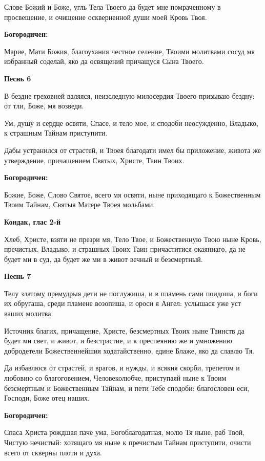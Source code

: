 Слове Божий и Боже, угль Тела Твоего да будет мне помраченному в просвещение, и очищение оскверненной души моей Кровь Твоя.


\medskip
\bfseries Богородичен:\normalfont{}

Марие, Мати Божия, благоухания честное селение, Твоими молитвами сосуд мя избранный соделай, яко да освящений причащуся Сына Твоего.


\medskip
\bfseries Песнь 6\normalfont{}


В бездне греховней валяяся, неизследную милосердия Твоего призываю бездну: от тли, Боже, мя возведи.


Ум, душу и сердце освяти, Спасе, и тело мое, и сподоби неосужденно, Владыко, к страшным Тайнам приступити.


Дабы устранился от страстей, и Твоея благодати имел бы приложение, живота же утверждение, причащением Святых, Христе, Таин Твоих.


\medskip
\bfseries Богородичен:\normalfont{}

Божие, Боже, Слово Святое, всего мя освяти, ныне приходящаго к Божественным Твоим Тайнам, Святыя Матере Твоея мольбами.


\medskip
\bfseries Кондак, глас 2-й\normalfont{}


Хлеб, Христе, взяти не презри мя, Тело Твое, и Божественную Твою ныне Кровь, пречистых, Владыко, и страшных Твоих Таин причаститися окаяннаго, да не будет ми в суд, да будет же ми в живот вечный и безсмертный.


\medskip
\bfseries Песнь 7\normalfont{}


Телу златому премудрыя дети не послужиша, и в пламень сами поидоша, и боги их обругаша, среди пламене возопиша, и ороси я Ангел: услышася уже уст ваших молитва.


Источник благих, причащение, Христе, безсмертных Твоих ныне Таинств да будет ми свет, и живот, и безстрастие, и к преспеянию же и умножению добродетели Божественнейшия ходатайственно, едине Блаже, яко да славлю Тя.


Да избавлюся от страстей, и врагов, и нужды, и всякия скорби, трепетом и любовию со благоговением, Человеколюбче, приступаяй ныне к Твоим безсмертным и Божественным Тайнам, и пети Тебе сподоби: благословен еси, Господи, Боже отец наших.


\medskip
\bfseries Богородичен:\normalfont{}

Спаса Христа рождшая паче ума, Богоблагодатная, молю Тя ныне, раб Твой, Чистую нечистый: хотящаго мя ныне к пречистым Тайнам приступити, очисти всего от скверны плоти и духа.


